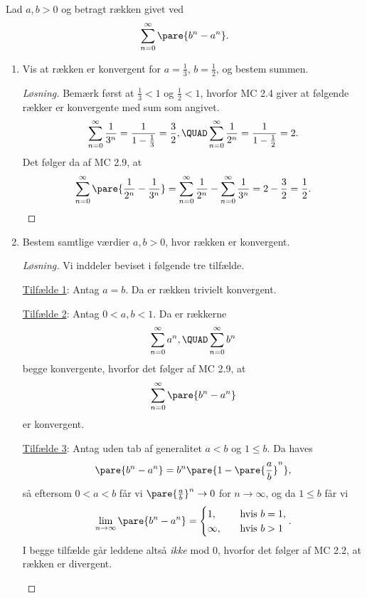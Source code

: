 \begin{opg}
Lad $a,b > 0$ og betragt rækken givet ved
$$ \sum_{n=0}^\infty \pare{b^n - a^n}. $$
\begin{enumerate}
    \item Vis at rækken er konvergent for $a = \frac{1}{3}$, $b = \frac{1}{2}$, og bestem summen.
    
    \begin{proof}[Løsning]
    Bemærk først at $\frac{1}{3} < 1$ og $\frac{1}{2} < 1$, hvorfor MC 2.4 giver at følgende rækker er konvergente med sum som angivet.
    $$ \sum_{n=0}^\infty \frac{1}{3^n} = \frac{1}{1-\frac{1}{3}} = \frac{3}{2}, \QUAD
        \sum_{n=0}^\infty \frac{1}{2^n} = \frac{1}{1-\frac{1}{2}} = 2. $$
    Det følger da af MC 2.9, at
    $$ \sum_{n=0}^\infty \pare{\frac{1}{2^n} - \frac{1}{3^n}}
        = \sum_{n=0}^\infty \frac{1}{2^n} - \sum_{n=0}^\infty \frac{1}{3^n} = 2-\frac{3}{2} = \frac{1}{2}. $$
    \end{proof}
    
    \item Bestem samtlige værdier $a,b>0$, hvor rækken er konvergent.
    
    \begin{proof}[Løsning]
    Vi inddeler beviset i følgende tre tilfælde.
    
    \begin{indent}
    \underline{Tilfælde 1}: Antag $a = b$. Da er rækken trivielt konvergent.
    
    \underline{Tilfælde 2}: Antag $0 < a,b<1$. Da er rækkerne
    $$ \sum_{n=0}^\infty a^n, \QUAD \sum_{n=0}^\infty b^n $$ 
    begge konvergente, hvorfor det følger af MC 2.9, at
    $$ \sum_{n=0}^\infty \pare{b^n - a^n} $$
    er konvergent.
    
    \underline{Tilfælde 3}: Antag uden tab af generalitet $a<b$ og $1\leq b$. Da haves
    $$ \pare{b^n - a^n}
        = b^n\pare{1 - \pare{\frac{a}{b}}^n}, $$
    så eftersom $0<a<b$ får vi $\pare{\frac{a}{b}}^n \to 0$ for $n\to\infty$, og da $1\leq b$ får vi
    $$ \lim_{n\to\infty} \pare{b^n-a^n} = \begin{cases}
        1, &\quad\text{hvis } b = 1, \\
        \infty, &\quad\text{hvis } b > 1
    \end{cases}. $$
    I begge tilfælde går leddene altså \textit{ikke} mod $0$, hvorfor det følger af MC 2.2, at rækken er divergent.
    \end{indent}
    \end{proof}
\end{enumerate}
\end{opg}

